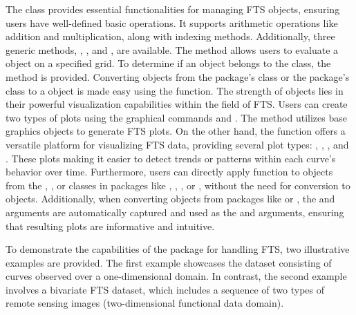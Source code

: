 The  class provides essential functionalities for managing FTS objects, ensuring users have well-defined basic operations. It supports arithmetic operations like addition and multiplication, along with indexing methods. Additionally, three generic methods, , , and , are available. The  method allows users to evaluate a  object on a specified grid. To determine if an object belongs to the  class, the  method is provided. Converting objects from the  package's  class or the  package's  class to a  object is made easy using the  function. The strength of  objects lies in their powerful visualization capabilities within the field of FTS. Users can create two types of plots using the graphical commands  and . The  method utilizes base graphics objects to generate FTS plots. On the other hand, the  function offers a versatile  platform for visualizing FTS data, providing several plot types: , , , and . These plots making it easier to detect trends or patterns within each curve's behavior over time. Furthermore, users can directly apply  function to objects from the , , or  classes in packages like , , , or , without the need for conversion to  objects. Additionally, when converting objects from packages like  or , the  and  arguments are automatically captured and used as the  and  arguments, ensuring that resulting plots are informative and intuitive.

To demonstrate the capabilities of the  package for handling FTS, two 
illustrative examples are provided. The first example showcases the  
dataset consisting of curves observed over a one-dimensional domain. In contrast, 
the second example involves a bivariate FTS dataset, which includes a sequence of 
two types of remote sensing images (two-dimensional functional data domain).
